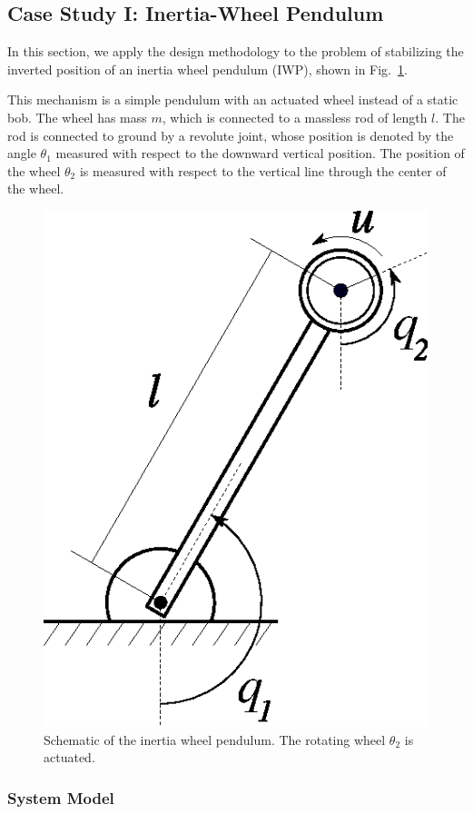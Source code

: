 

\subsection{Case Study I: Inertia-Wheel Pendulum}
\label{sec:iwp}

In this section, we apply the design methodology to the problem of stabilizing
the inverted position of an inertia wheel pendulum (IWP), shown in
Fig.~\ref{fig:iwp}. 

This mechanism is a simple pendulum with an actuated wheel instead of a static
bob.
%
The wheel has mass $m$, which is connected to a massless rod of length \(l\). 
%
The rod is connected to ground by a revolute joint, whose position
is denoted by the angle \(\theta_1\) measured with respect to the downward
vertical position.
%
The position of the wheel \(\theta_2\) is measured with respect to the vertical
line through the center of the wheel.

\begin{figure}[tb]
    \centering
    \includegraphics[width=0.27\linewidth]{figures/iwp.eps}
    \caption{Schematic of the inertia wheel pendulum. The rotating wheel \(\theta_2\) is actuated.}
    \label{fig:iwp}
\end{figure}

\subsubsection{System Model}

